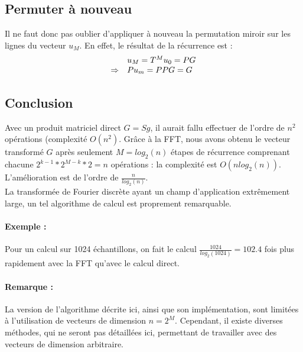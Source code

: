 \documentclass{report}
\begin{document}
		\subsection{Permuter à nouveau}
		Il ne faut donc pas oublier d'appliquer à nouveau la permutation miroir sur les lignes du vecteur $u_M$. En effet, le résultat de la récurrence est :
		\[
		\begin{array}{l l l}
			& u_M = T^Mu_0 = PG\\
			\Rightarrow & Pu_m = PPG = G
		\end{array}
		\]

		\subsection{Conclusion}
		Avec un produit matriciel direct $G = Sg$, il aurait fallu effectuer de l'ordre de $n^2$ opérations (complexité $O(n^2)$. Grâce à la FFT, nous avons obtenu le vecteur transformé $G$ après seulement $M = log_2(n)$ étapes de récurrence comprenant chacune $2^{k-1} * 2^{M-k} * 2 = n$ opérations : la complexité est $O(n log_2(n))$. L'amélioration est de l'ordre de $\frac{n}{log_2(n)}$.\\
		La transformée de Fourier discrète ayant un champ d'application extrêmement large, un tel algorithme de calcul est proprement remarquable.

			\paragraph{Exemple :}
			Pour un calcul sur 1024 échantillons, on fait le calcul $\frac{1024}{log_2(1024)} = 102.4$ fois plus rapidement avec la FFT qu'avec le calcul direct.
			\paragraph{Remarque : }
			La version de l'algorithme décrite ici, ainsi que son implémentation, sont limitées à l'utilisation de vecteurs de dimension $n = 2^M$. Cependant, il existe diverses méthodes, qui ne seront pas détaillées ici, permettant de travailler avec des vecteurs de dimension arbitraire.
\end{document}
